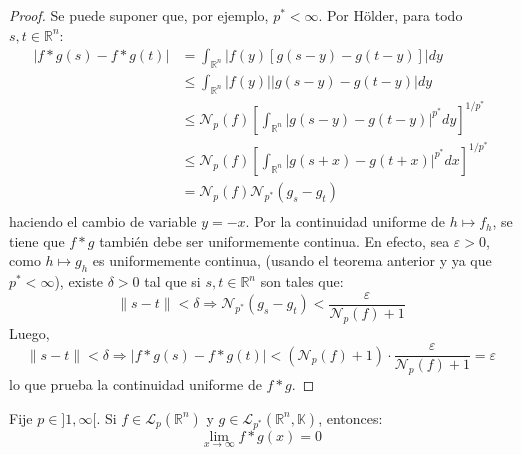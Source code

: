 \documentclass[12pt]{report}
\theoremstyle{largebreak}
\newcommand\abs[1]{\ensuremath{\big|#1\big|}}
\newcommand\norm[1]{\ensuremath{\|#1\|}}
\newcommand{\N}[2]{\ensuremath{\mathcal{N}_{#1}\left(#2\right)}}
\begin{document}
    \begin{proof}
        Se puede suponer que, por ejemplo, $p^*<\infty$. Por Hölder, para todo $s,t\in\mathbb{R}^n$:
        \begin{equation*}
            \begin{split}
                \abs{f*g(s)-f*g(t)}&=\int_{\mathbb{R}^n}\abs{f(y)[g(s-y)-g(t-y)]}dy\\
                &\leq\int_{\mathbb{R}^n}\abs{f(y)}\abs{g(s-y)-g(t-y)}dy\\
                &\leq\N{p}{f}\left[\int_{\mathbb{R}^n}\abs{g(s-y)-g(t-y)}^{ p^*}dy \right]^{1/p^*}\\
                &\leq\N{p}{f}\left[\int_{\mathbb{R}^n}\abs{g(s+x)-g(t+x)}^{ p^*}dx \right]^{1/p^*}\\
                &=\N{p}{f}\N{p^*}{g_s-g_t}\\
            \end{split}
        \end{equation*}
        haciendo el cambio de variable $y=-x$. Por la continuidad uniforme de $h\mapsto f_h$, se tiene que $f*g$ también debe ser uniformemente continua. En efecto, sea $\varepsilon>0$, como $h\mapsto g_h$ es uniformemente continua, (usando el teorema anterior y ya que $p^*<\infty$), existe $\delta>0$ tal que si $s,t\in\mathbb{R}^n$ son tales que:
        \begin{equation*}
            \norm{s-t}<\delta\Rightarrow\N{p^*}{g_s-g_t}<\frac{\varepsilon}{\N{p}{f}+1}
        \end{equation*}
        Luego,
        \begin{equation*}
            \norm{s-t}<\delta\Rightarrow\abs{f*g(s)-f*g(t)}<\left(\N{p}{f}+1 \right)\cdot\frac{\varepsilon}{\N{p}{f}+1}=\varepsilon
        \end{equation*}
        lo que prueba la continuidad uniforme de $f*g$.
    \end{proof}

    \begin{propo}
        Fije $p\in ]1,\infty[$. Si $f\in\mathcal{L}_p(\mathbb{R}^n)$ y $g\in\mathcal{L}_{ p^*}(\mathbb{R}^n,\mathbb{K})$, entonces:
        \begin{equation*}
            \lim_{x\rightarrow\infty}f*g(x)=0
        \end{equation*}
    \end{propo}
\end{document}
